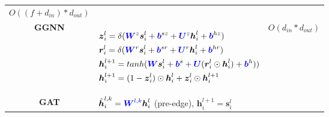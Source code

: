 \begin{table}
\begin{footnotesize}
\begin{tabular}{cp{20em}r}
			$O((f + d_{in}) * d_{out})$                                                                                                                                                                                        \\
			\textbf{GGNN}                                                                                                                                                                                                    &
			\begin{scriptsize}
				$\begin{aligned}[t]
						 & {\boldsymbol{z}}_i^l = \delta ( \textcolor{blue}{\boldsymbol{W}}^z \boldsymbol{s}_i^l + \textcolor{blue}{\boldsymbol{b}}^{sz} + \textcolor{blue}{\boldsymbol{U}}^z \boldsymbol{h}_i^{l} + \textcolor{blue}{\boldsymbol{b}}^{hz})                    \\
						 & \boldsymbol{r}_i^l = \delta ( \textcolor{blue}{\boldsymbol{W}}^r \boldsymbol{s}_i^l+ \textcolor{blue}{\boldsymbol{b}}^{sr} +\textcolor{blue}{\boldsymbol{U}}^r \boldsymbol{h}_i^{l} + \textcolor{blue}{\boldsymbol{b}}^{hr})                        \\
						 & \boldsymbol{h}_i^{l+1} = tanh ( \textcolor{blue}{\boldsymbol{W}} \boldsymbol{s}_i^l + \textcolor{blue}{\boldsymbol{b}}^s + \textcolor{blue}{\boldsymbol{U}} ( \boldsymbol{r}_i^l \odot \boldsymbol{h}_i^{l}) + \textcolor{blue}{\boldsymbol{b}}^h)) \\
						 & \boldsymbol{h}_i^{l+1} = (1 - {\boldsymbol{z}}_i^l) \odot \boldsymbol{h}_i^l + {\boldsymbol{z}}_i^l \odot \boldsymbol{h}_i^{l+1}
					\end{aligned}$
			\end{scriptsize}
			                                                                                                                                                                                                                 &
			$O(d_{in} * d_{out})$                                                                                                                                                                                              \\
			\textbf{GAT}                                                                                                                                                                                                     &
			$\hat{\boldsymbol{h}}^{l,k}_{i} = \textcolor{blue}{\boldsymbol{W}^{l,k}} \boldsymbol{h}_i^{l}$ (pre-edge), $\boldsymbol{h}_i^{l+1} = \boldsymbol{s}_i^l$                                                         &

\end{tabular}
\end{footnotesize}
\end{table}
